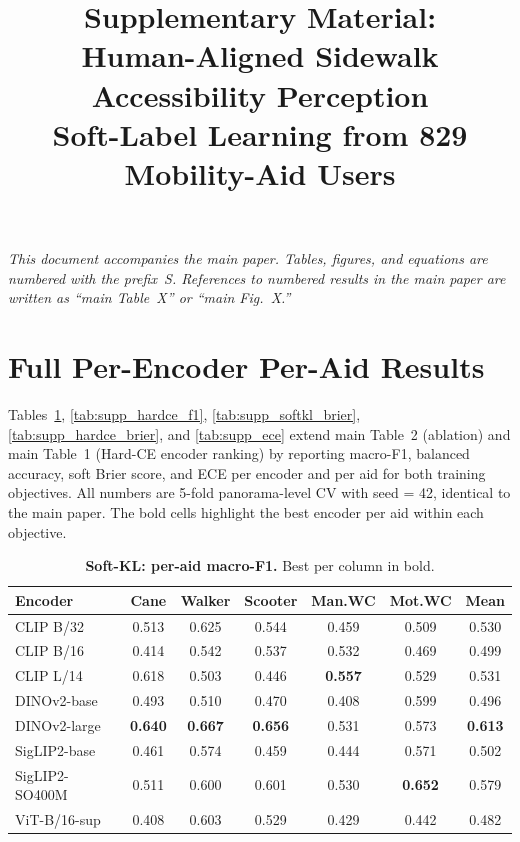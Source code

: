 \documentclass[conference]{IEEEtran}
\begin{document}
\title{Supplementary Material:\\
Human-Aligned Sidewalk Accessibility Perception\\
Soft-Label Learning from 829 Mobility-Aid Users}
\maketitle

\noindent\emph{This document accompanies the main paper. Tables, figures, and equations are numbered with the prefix~S. References to numbered results in the main paper are written as ``main Table~X'' or ``main Fig.~X.''}

\tableofcontents
\vspace{1em}

\section{Full Per-Encoder Per-Aid Results}
\label{sec:supp_full_cv}

Tables~\ref{tab:supp_softkl_f1}, \ref{tab:supp_hardce_f1}, \ref{tab:supp_softkl_brier}, \ref{tab:supp_hardce_brier}, and \ref{tab:supp_ece} extend main Table~2 (ablation) and main Table~1 (Hard-CE encoder ranking) by reporting macro-F1, balanced accuracy, soft Brier score, and ECE per encoder and per aid for both training objectives. All numbers are 5-fold panorama-level CV with seed = 42, identical to the main paper. The bold cells highlight the best encoder per aid within each objective.

\begin{table}[!t]
\caption{\textbf{Soft-KL: per-aid macro-F1.} Best per column in bold.}
\label{tab:supp_softkl_f1}
\centering\scriptsize
\setlength{\tabcolsep}{4pt}
\begin{tabular}{@{}lcccccc@{}}
\toprule
\textbf{Encoder} & \textbf{Cane} & \textbf{Walker} & \textbf{Scooter} & \textbf{Man.WC} & \textbf{Mot.WC} & \textbf{Mean} \\
\midrule
CLIP B/32      & 0.513 & 0.625 & 0.544 & 0.459 & 0.509 & 0.530 \\
CLIP B/16      & 0.414 & 0.542 & 0.537 & 0.532 & 0.469 & 0.499 \\
CLIP L/14      & 0.618 & 0.503 & 0.446 & \textbf{0.557} & 0.529 & 0.531 \\
DINOv2-base    & 0.493 & 0.510 & 0.470 & 0.408 & 0.599 & 0.496 \\
DINOv2-large   & \textbf{0.640} & \textbf{0.667} & \textbf{0.656} & 0.531 & 0.573 & \textbf{0.613} \\
SigLIP2-base   & 0.461 & 0.574 & 0.459 & 0.444 & 0.571 & 0.502 \\
SigLIP2-SO400M & 0.511 & 0.600 & 0.601 & 0.530 & \textbf{0.652} & 0.579 \\
ViT-B/16-sup   & 0.408 & 0.603 & 0.529 & 0.429 & 0.442 & 0.482 \\
\bottomrule
\end{tabular}
\end{table}
\end{document}
